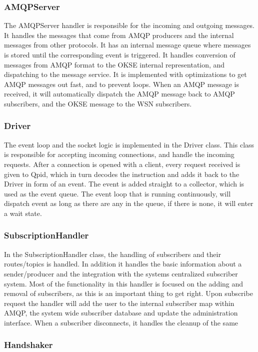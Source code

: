 \subsubsection{AMQPServer}
The AMQPServer handler is responsible for the incoming and outgoing messages. It handles the messages that come from AMQP producers and the internal messages from other protocols. It has an internal message queue where messages is stored until the corresponding event is triggered. It handles conversion of messages from AMQP format to the OKSE internal representation, and dispatching to the message service. It is implemented with optimizations to get AMQP messages out fast, and to prevent loops. When an AMQP message is received, it will automatically dispatch the AMQP message back to AMQP subscribers, and the OKSE message to the WSN subscribers.

\subsubsection{Driver}
The event loop and the socket logic is implemented in the Driver class. This class is responsible for accepting incoming connections, and handle the incoming requests. After a connection is opened with a client, every request received is given to Qpid, which in turn decodes the instruction and adds it back to the Driver in form of an event. The event is added straight to a collector, which is used as the event queue. The event loop that is running continuously, will dispatch event as long as there are any in the queue, if there is none, it will enter a wait state.

\subsubsection{SubscriptionHandler}
In the SubscriptionHandler class, the handling of subscribers and their routes/topics is handled. In addition it handles the basic information about a sender/producer and the integration with the systems centralized subscriber system. Most of the functionality in this handler is focused on the adding and removal of subscribers, as this is an important thing to get right. Upon subscribe request the handler will add the user to the internal subscriber map within AMQP, the system wide subscriber database and update the administration interface. When a subscriber disconnects, it handles the cleanup of the same 

\subsubsection{Handshaker}



